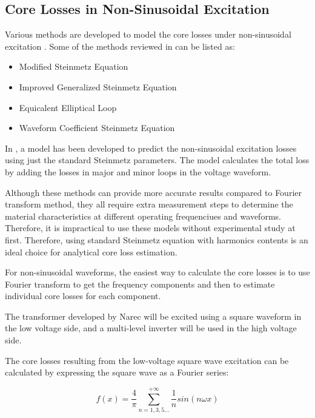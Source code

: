 \documentclass[a4paper, 11pt]{article} %
\begin{document}
\subsection{Core Losses in Non-Sinusoidal Excitation}

Various methods are developed to model the core losses under non-sinusoidal excitation \cite{Venkatachalam2002,Reinert2001}. Some of the methods reviewed in \cite{Villar2010} can be listed as:

\begin{itemize}
\item	Modified Steinmetz Equation
\item	Improved Generalized Steinmetz Equation
\item	Equicalent Elliptical Loop
\item	Waveform Coefficient Steinmetz Equation
\end{itemize}

In \cite{Venkatachalam2002}, a model has been developed to predict the non-sinusoidal excitation losses using just the standard Steinmetz parameters. The model calculates the total loss by adding the losses in major and minor loops in the voltage waveform.



Although these methods can provide more accurate results compared to Fourier transform method, they all require extra measurement steps to determine the material characteristics at different operating frequenciues and waveforms. Therefore, it is impractical to use these models without experimental study at first. Therefore, using standard Steinmetz equation with harmonics contents is an ideal choice for analytical core loss estimation.

For non-sinusoidal waveforms, the easiest way to calculate the core losses is to use Fourier transform to get the frequency components and then to estimate individual core losses for each component. 

The transformer developed by Narec will be excited using a square waveform in the low voltage side, and a multi-level inverter will be used in the high voltage side.

The core losses resulting from the low-voltage square wave excitation can be calculated by expressing the square wave as a Fourier series:

\begin{equation}
 f(x) = \frac{4}{\pi} \sum_{n=1,3,5...}^{+\infty} \frac{1}{n} sin ( n \omega x )
\end{equation}
\end{document}

